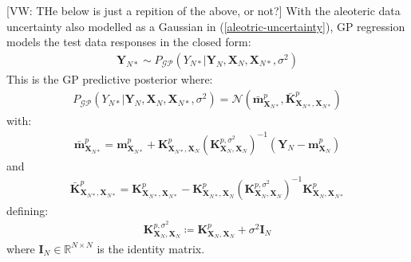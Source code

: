 \documentclass{article}
\newcommand{\vw}[1]{{\color{green} [VW: #1]}}
\newcommand{\GP}{\operatorname{\mathcal{GP}}}
\numberwithin{equation}{section}
\begin{document}
\vw{THe below is just a repition of the above, or not?}
With the aleoteric data uncertainty also modelled as a Gaussian in (\ref{aleotric-uncertainty}), GP regression models the test data responses in the closed form:
\begin{align}
    \mathbf{Y}_{N*} \sim P_{\GP}\left(Y_{N*} \vert \mathbf{Y}_N, \mathbf{X}_N, \mathbf{X}_{N*}, \sigma^2\right)
\end{align}
This is the GP predictive posterior where:
\begin{align}
    P_{\GP}\left(Y_{N*} \vert \mathbf{Y}_N, \mathbf{X}_N, \mathbf{X}_{N*}, \sigma^2\right) = \mathcal{N}\left(\bar{\mathbf{m}}^p_{\mathbf{X}_{N*}}, \bar{\mathbf{K}}^p_{\mathbf{X}_{N*}, \mathbf{X}_{N*}}\right)
\end{align}
with:
\begin{align}
    \bar{\mathbf{m}}^p_{\mathbf{X}_{N*}} = \mathbf{m}^p_{\mathbf{X}_{N*}} + \mathbf{K}^p_{\mathbf{X}_{N*}, \mathbf{X}_N} \left( \mathbf{K}^{p, \sigma^2}_{\mathbf{X}_N, \mathbf{X}_N}\right)^{-1} \left( \mathbf{Y}_N - \mathbf{m}^p_{\mathbf{X}_N}\right)
\end{align}
and
\begin{align}
    \bar{\mathbf{K}}^p_{\mathbf{X}_{N*}, \mathbf{X}_{N*}} = \mathbf{K}^p_{\mathbf{X}_{N*}, \mathbf{X}_{N*}} - \mathbf{K}^p_{\mathbf{X}_{N*}, \mathbf{X}_N}\left( \mathbf{K}^{p, \sigma^2}_{\mathbf{X}_N, \mathbf{X}_N}\right)^{-1}\mathbf{K}^p_{\mathbf{X}_N, \mathbf{X}_{N*}}
\end{align}
defining:
\begin{align}
    \mathbf{K}^{p, \sigma^2}_{\mathbf{X}_N, \mathbf{X}_N} \coloneqq \mathbf{K}^p_{\mathbf{X}_N, \mathbf{X}_N} + \sigma^2 \mathbf{I}_N
\end{align}
where $\mathbf{I}_N \in \mathbb{R}^{N \times N}$ is the identity matrix.
\end{document}
